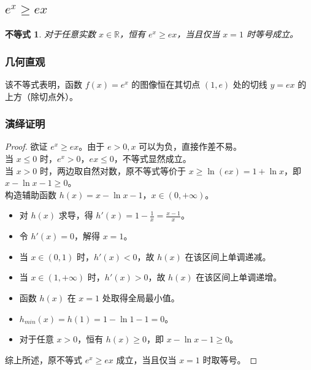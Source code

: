 \documentclass[a4paper,12pt]{ctexart}
\theoremstyle{mytheoremstyle}
\newtheorem{theorem}{不等式}
\begin{document}
\newpage
\subsection{\textcolor{MyPurple}{$e^x \ge ex$}}

\begin{theorem}
对于任意实数 $x \in \mathbb{R}$，恒有 $e^x \ge ex$，当且仅当 $x=1$ 时等号成立。
\end{theorem}

\subsubsection*{\textcolor{MyGreen}{几何直观}}
该不等式表明，函数 $f(x) = e^x$ 的图像恒在其切点 $(1, e)$ 处的切线 $y = ex$ 的上方（除切点外）。

\subsubsection*{\textcolor{MyGreen}{演绎证明}}
\begin{proof}
欲证 $e^x \ge ex$。由于 $e>0, x$ 可以为负，直接作差不易。\\
当 $x \le 0$ 时，$e^x>0$，$ex \le 0$，不等式显然成立。\\
当 $x > 0$ 时，两边取自然对数，原不等式等价于 $x \ge \ln(ex) = 1 + \ln x$，即 $x - \ln x - 1 \ge 0$。\\
构造辅助函数 $h(x) = x - \ln x - 1$，$x \in (0, +\infty)$。
\begin{itemize}
    \item[∵] 对 $h(x)$ 求导，得 $h'(x) = 1 - \frac{1}{x} = \frac{x-1}{x}$。
    \item[∵] 令 $h'(x) = 0$，解得 $x=1$。
    \item[∵] 当 $x \in (0, 1)$ 时，$h'(x) < 0$，故 $h(x)$ 在该区间上单调递减。
    \item[∵] 当 $x \in (1, +\infty)$ 时，$h'(x) > 0$，故 $h(x)$ 在该区间上单调递增。
    \item[∴] 函数 $h(x)$ 在 $x=1$ 处取得全局最小值。
    \item[∵] $h_{min}(x) = h(1) = 1 - \ln 1 - 1 = 0$。
    \item[∴] 对于任意 $x > 0$，恒有 $h(x) \ge 0$，即 $x - \ln x - 1 \ge 0$。
\end{itemize}
综上所述，原不等式 $e^x \ge ex$ 成立，当且仅当 $x=1$ 时取等号。
\end{proof}
\end{document}
